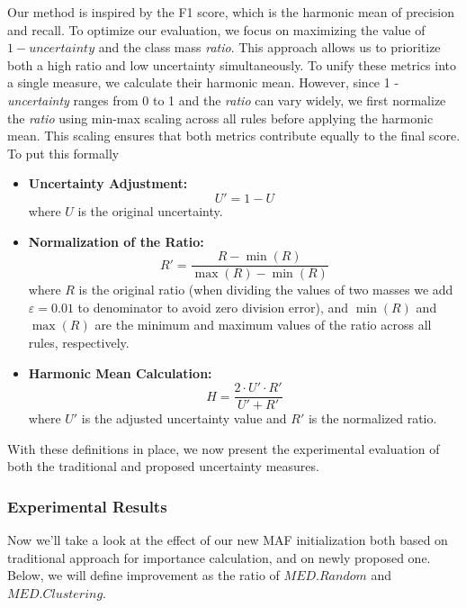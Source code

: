 \documentclass[10pt,a4paper,oneside]{article}
\begin{document}
Our method is inspired by the F1 score, which is the harmonic mean of precision and recall. To optimize our evaluation, we focus on maximizing the value of $1 - \textit{uncertainty}$ and the class mass \textit{ratio}. This approach allows us to prioritize both a high ratio and low uncertainty simultaneously. To unify these metrics into a single measure, we calculate their harmonic mean. However, since 1 - \textit{uncertainty} ranges from 0 to 1 and the \textit{ratio} can vary widely, we first normalize the \textit{ratio} using min-max scaling across all rules before applying the harmonic mean. This scaling ensures that both metrics contribute equally to the final score.
To put this formally 
\begin{itemize}
    \item \textbf{Uncertainty Adjustment:}
    \[
    U' = 1 - U
    \]
    where \( U \) is the original uncertainty.

    \item \textbf{Normalization of the Ratio:}
    \[
    R' = \frac{R - \min(R)}{\max(R) - \min(R)}
    \]
    where \( R \) is the original ratio (when dividing the values of two masses we add $\varepsilon=0.01$ to denominator to avoid zero division error), and \( \min(R) \) and \( \max(R) \) are the minimum and maximum values of the ratio across all rules, respectively.

    \item \textbf{Harmonic Mean Calculation:}
    \[
    H = \frac{2 \cdot U' \cdot R'}{U' + R'}
    \]
    where \( U' \) is the adjusted uncertainty value and \( R' \) is the normalized ratio.
\end{itemize}

{\color{red}With these definitions in place, we now present the experimental evaluation of both the traditional and proposed uncertainty measures.}

\subsubsection{Experimental Results}
Now we'll take a look at the effect of our new MAF initialization both based on traditional approach for importance calculation, and on newly proposed one. Below, we will define improvement as the ratio of $MED. Random$ and $MED. Clustering$.

\FloatBarrier
\end{document}
